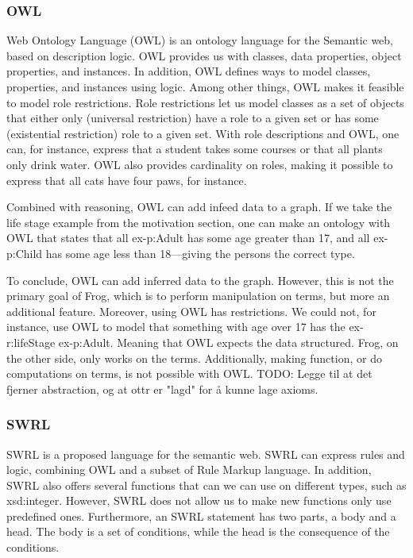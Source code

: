 \subsubsection{OWL}
Web Ontology Language (OWL) is an ontology language for the Semantic web, based on description logic. OWL provides us with classes, data properties, object properties, and instances. In addition, OWL defines ways to model classes, properties, and instances using logic. Among other things, OWL makes it feasible to model role restrictions. Role restrictions let us model classes as a set of objects that either only (universal restriction) have a role to a given set or has some (existential restriction) role to a given set.  With role descriptions and OWL, one can, for instance, express that a student takes some courses or that all plants only drink water. OWL also provides cardinality on roles, making it possible to express that all cats have four paws, for instance.

\para
Combined with reasoning, OWL can add infeed data to a graph. If we take the life stage example from the motivation section, one can make an ontology with OWL that states that all ex-p:Adult has some age greater than 17, and all ex-p:Child has some age less than 18—giving the persons the correct type.

\para 
To conclude, OWL can add inferred data to the graph. However, this is not the primary goal of Frog, which is to perform manipulation on terms, but more an additional feature. Moreover, using OWL has restrictions. We could not, for instance, use OWL to model that something with age over 17 has the ex-r:lifeStage ex-p:Adult. Meaning that OWL expects the data structured. Frog, on the other side, only works on the terms. Additionally, making function, or do computations on terms, is not possible with OWL. TODO: Legge til at det fjerner abstraction, og at ottr er "lagd" for å kunne lage axioms. 

\subsubsection{SWRL}
SWRL is a proposed language for the semantic web. SWRL can express rules and logic, combining OWL and a subset of Rule Markup language. In addition, SWRL also offers several functions that can we can use on different types, such as xsd:integer. However, SWRL does not allow us to make new functions only use predefined ones. Furthermore, an SWRL statement has two parts, a body and a head. The body is a set of conditions, while the head is the consequence of the conditions.

